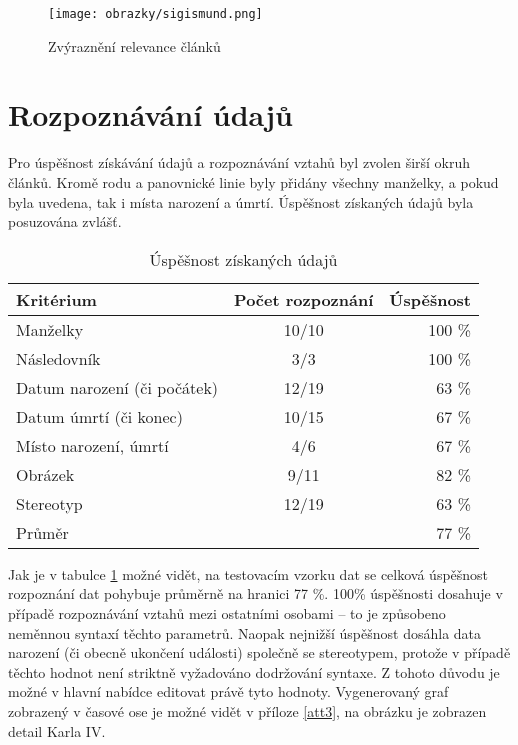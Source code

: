 \begin{figure}[h]
	\centering
	\texttt{[image: obrazky/sigismund.png]}
	\caption{Zvýraznění relevance článků}
	\label{obrrelevance}
\end{figure}

\section{Rozpoznávání údajů}
Pro úspěšnost získávání údajů a rozpoznávání vztahů byl zvolen širší okruh článků. Kromě rodu a panovnické linie byly přidány všechny manželky, a pokud byla uvedena, tak i místa narození a úmrtí. Úspěšnost získaných údajů byla posuzována zvlášť.


\begin{table}[h]
\centering
\begin{tabular}{|l|c|r|}
\hline
Kritérium 					& Počet rozpoznání 	& Úspěšnost \\ \hline \hline
Manželky					& 10/10				& 100 \%	\\ \hline
Následovník 				& 3/3				& 100 \%	\\ \hline
Datum narození (či počátek)	& 12/19				& 63 \%		\\ \hline
Datum úmrtí (či konec)		& 10/15				& 67 \%		\\ \hline
Místo narození, úmrtí		& 4/6				& 67 \%		\\ \hline
Obrázek 					& 9/11				& 82 \%		\\ \hline
Stereotyp 					& 12/19				& 63 \%		\\ \hline \hline
Průměr 						& 					& 77 \%		\\ \hline
\end{tabular}
\caption{Úspěšnost získaných údajů}
\label{tabMining}
\end{table}

Jak je v tabulce \ref{tabMining} možné vidět, na testovacím vzorku dat se celková úspěšnost rozpoznání dat pohybuje průměrně na hranici 77 \%. 100\% úspěšnosti dosahuje v případě rozpoznávání vztahů mezi ostatními osobami -- to je způsobeno neměnnou syntaxí těchto parametrů. Naopak nejnižší úspěšnost dosáhla data narození (či obecně ukončení události) společně se stereotypem, protože v případě těchto hodnot není striktně vyžadováno dodržování syntaxe. Z tohoto důvodu je možné v hlavní nabídce editovat právě tyto hodnoty. Vygenerovaný graf zobrazený v časové ose je možné vidět v příloze \ref{att3}, na obrázku je zobrazen detail Karla IV.